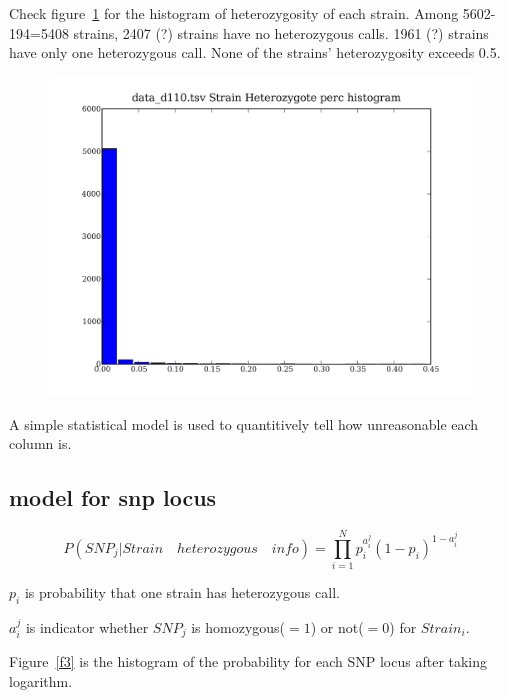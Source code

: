 \documentclass[a4paper,10pt]{article}
\begin{document}
Check figure~\ref{f2} for the histogram of heterozygosity of each strain. Among 5602-194=5408 strains, 2407 (?) strains have no heterozygous calls. 1961 (?) strains have only one heterozygous call. None of the strains' heterozygosity exceeds 0.5.

\begin{figure}
\includegraphics[width=1\textwidth]{figures/data_d110_strain_hz_perc.png}
\caption{}\label{f2}
\end{figure}

A simple statistical model is used to quantitively tell how unreasonable each column is.

\subsection{model for snp locus}
\begin{equation}
P({SNP}_j|Strain\quad heterozygous\quad info) = \prod_{i=1}^{N} p_i^{a_i^j} (1-p_i)^{1-a_i^j}
\end{equation}

$p_i$ is probability that one strain has heterozygous call.

$a_i^j$ is indicator whether ${SNP}_j$ is homozygous($=1$) or not($=0$) for ${Strain}_i$.

Figure~\ref{f3} is the histogram of the probability for each SNP locus after taking logarithm.
\end{document}
